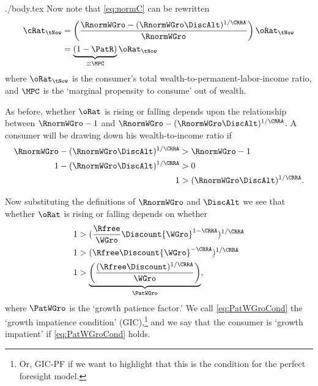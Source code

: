 \documentclass{handout}
\begin{document}
\begin{verbatimwrite}{./body.tex}
Now note that \eqref{eq:normC} can be rewritten
\begin{equation}\begin{gathered}\begin{aligned}
        \cRat_{\tNow} & =  \left(\frac{\RnormWGro-(\RnormWGro\DiscAlt)^{1/\CRRA}}{\RnormWGro}\right)\oRat_{\tNow}
\\ & =  \underbrace{(1 - \PatR)}_{\equiv \MPC} \oRat_{\tNow}
\end{aligned}\end{gathered}\end{equation}
where $\oRat_{\tNow}$ is the consumer's total wealth-to-permanent-labor-income 
ratio, and $\MPC$ is the `marginal propensity to consume' out of wealth.

As before, whether $\oRat$ is rising or falling depends upon the 
relationship between $\RnormWGro-1$ and 
$\RnormWGro-(\RnormWGro\DiscAlt)^{1/\CRRA}$.  A consumer will be 
drawing down his wealth-to-income ratio if
\begin{equation}\begin{gathered}\begin{aligned}
        \RnormWGro-(\RnormWGro\DiscAlt)^{1/\CRRA} & >  \RnormWGro-1  \\
        1-(\RnormWGro\DiscAlt)^{1/\CRRA} & >  0  \\
        1 & >  (\RnormWGro\DiscAlt)^{1/\CRRA}
.
\end{aligned}\end{gathered}\end{equation}

Now substituting the definitions of $\RnormWGro$ and $\DiscAlt$
we see that whether $\oRat$ is rising or falling depends on whether
\begin{equation}\begin{gathered}\begin{aligned}
        1 & >  (\frac{\Rfree}{{\WGro}}\Discount {\WGro}^{1-\CRRA})^{1/\CRRA}
\\  1 & >  (\Rfree\Discount {\WGro}^{-\CRRA})^{1/\CRRA}
\\  1 & >  \underbrace{\left(\frac{(\Rfree\Discount)^{1/\CRRA}}{\WGro}\right)}_{\PatWGro} \label{eq:PatWGroCond}
,
\end{aligned}\end{gathered}\end{equation}
where $\PatWGro$ is the `growth patience factor.'  We call \eqref{eq:PatWGroCond} the `growth impatience condition' (GIC),\footnote{Or, GIC-PF if we want to highlight that this is the condition for the perfect foresight model.} and we say that the consumer is
`growth impatient' if \eqref{eq:PatWGroCond} holds.


\end{verbatimwrite}
\end{document}
